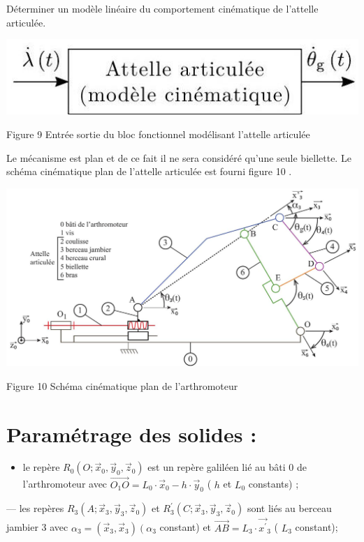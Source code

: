 \documentclass[10pt]{article}
\begin{document}
Déterminer un modèle linéaire du comportement cinématique de l'attelle articulée.

\begin{center}
\includegraphics[max width=\textwidth]{2024_07_14_a83aebba33898893d39fg-06}
\end{center}

Figure 9 Entrée sortie du bloc fonctionnel modélisant l'attelle articulée

Le mécanisme est plan et de ce fait il ne sera considéré qu'une seule biellette. Le schéma cinématique plan de l'attelle articulée est fourni figure 10 .

\begin{center}
\includegraphics[max width=\textwidth]{2024_07_14_a83aebba33898893d39fg-06(1)}
\end{center}

Figure 10 Schéma cinématique plan de l'arthromoteur

\section*{Paramétrage des solides :}
\begin{itemize}
  \item le repère $R_{0}\left(O ; \vec{x}_{0}, \vec{y}_{0}, \vec{z}_{0}\right)$ est un repère galiléen lié au bâti 0 de l'arthromoteur avec $\overrightarrow{O_{1} O}=L_{0} \cdot \vec{x}_{0}-h \cdot \vec{y}_{0}$ ( $h$ et $L_{0}$ constants) ;
\end{itemize}

— les repères $R_{3}\left(A ; \vec{x}_{3}, \vec{y}_{3}, \vec{z}_{0}\right)$ et $R_{3}^{\prime}\left(C ; \vec{x}_{3}, \vec{y}_{3}, \vec{z}_{0}\right)$ sont liés au berceau jambier 3 avec $\alpha_{3}=\left(\vec{x}_{3}, \vec{x}_{3}\right)\left(\alpha_{3}\right.$ constant) et $\overrightarrow{A B}=L_{3} \cdot \overrightarrow{x^{\prime}}{ }_{3}$ ( $L_{3}$ constant);
\end{document}
